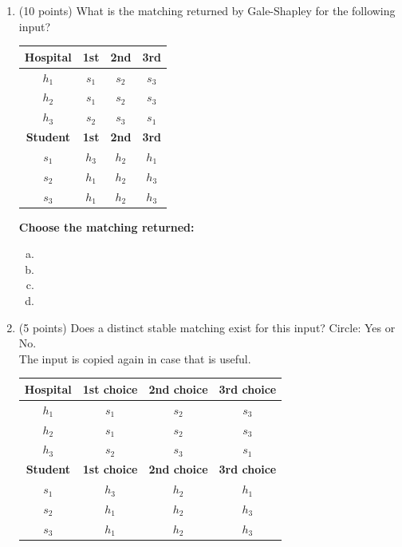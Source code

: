 \documentclass[11pt]{article}
\begin{document}
\begin{enumerate}


\item (10 points) What is the matching returned by Gale-Shapley for the following input? 

\noindent
\begin{minipage}[t]{0.4\textwidth}
\vspace{0pt}
\centering
\small
\begin{tabular}{c|ccc}
\textbf{Hospital} & \textbf{1st} & \textbf{2nd} & \textbf{3rd} \\
\hline
$h_1$ & $s_1$ & $s_2$ & $s_3$ \\
$h_2$ & $s_1$ & $s_2$ & $s_3$ \\
$h_3$ & $s_2$ & $s_3$ & $s_1$ \\
\hline
\textbf{Student} & \textbf{1st} & \textbf{2nd} & \textbf{3rd} \\
\hline
$s_1$ & $h_3$ & $h_2$ & $h_1$ \\
$s_2$ & $h_1$ & $h_2$ & $h_3$ \\
$s_3$ & $h_1$ & $h_2$ & $h_3$ \\
\end{tabular}
\end{minipage}\hfill
\begin{minipage}[t]{0.57\textwidth}
\vspace{0pt}
\small
\textbf{Choose the matching returned:}
\begin{enumerate}[(a)]
    \item {}
    \item {}
    \item {}
    \item {}
\end{enumerate}
\end{minipage}

\item (5 points) Does a distinct stable matching exist for this input? Circle: Yes or No.
\\
The input is copied again in case that is useful.


\begin{table}[h]
\centering
\begin{tabular}{c|ccc}
\textbf{Hospital} & \textbf{1st choice} & \textbf{2nd choice} & \textbf{3rd choice} \\
\hline
$h_1$ & $s_1$ & $s_2$ & $s_3$ \\
$h_2$ & $s_1$ & $s_2$ & $s_3$ \\
$h_3$ & $s_2$ & $s_3$ & $s_1$ \\
\hline
\textbf{Student} & \textbf{1st choice} & \textbf{2nd choice} & \textbf{3rd choice} \\
\hline
$s_1$ & $h_3$ & $h_2$ & $h_1$ \\
$s_2$ & $h_1$ & $h_2$ & $h_3$ \\
$s_3$ & $h_1$ & $h_2$ & $h_3$ \\
\end{tabular}
\end{table}


\end{enumerate}
\end{document}
